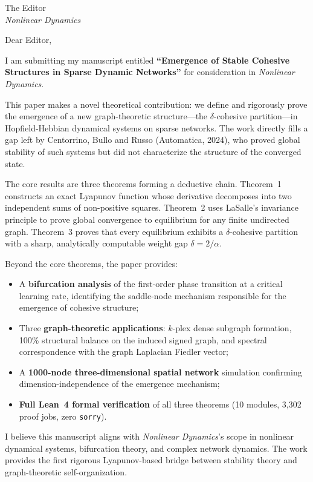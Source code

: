 \documentclass[a4paper,11pt]{letter}
\begin{document}
\begin{letter}{The Editor\\
\textit{Nonlinear Dynamics}}

\opening{Dear Editor,}

I am submitting my manuscript entitled \textbf{``Emergence of Stable Cohesive Structures in Sparse Dynamic Networks''} for consideration in \textit{Nonlinear Dynamics}.

This paper makes a novel theoretical contribution: we define and rigorously prove the emergence of a new graph-theoretic structure---the $\delta$-cohesive partition---in Hopfield-Hebbian dynamical systems on sparse networks. The work directly fills a gap left by Centorrino, Bullo and Russo (Automatica, 2024), who proved global stability of such systems but did not characterize the structure of the converged state.

The core results are three theorems forming a deductive chain. Theorem~1 constructs an exact Lyapunov function whose derivative decomposes into two independent sums of non-positive squares. Theorem~2 uses LaSalle's invariance principle to prove global convergence to equilibrium for any finite undirected graph. Theorem~3 proves that every equilibrium exhibits a $\delta$-cohesive partition with a sharp, analytically computable weight gap $\delta = 2/\alpha$.

Beyond the core theorems, the paper provides:
\begin{itemize}
    \item A \textbf{bifurcation analysis} of the first-order phase transition at a critical learning rate, identifying the saddle-node mechanism responsible for the emergence of cohesive structure;
    \item Three \textbf{graph-theoretic applications}: $k$-plex dense subgraph formation, 100\% structural balance on the induced signed graph, and spectral correspondence with the graph Laplacian Fiedler vector;
    \item A \textbf{1000-node three-dimensional spatial network} simulation confirming dimension-independence of the emergence mechanism;
    \item \textbf{Full Lean~4 formal verification} of all three theorems (10 modules, 3,302 proof jobs, zero \texttt{sorry}).
\end{itemize}

I believe this manuscript aligns with \textit{Nonlinear Dynamics}'s scope in nonlinear dynamical systems, bifurcation theory, and complex network dynamics. The work provides the first rigorous Lyapunov-based bridge between stability theory and graph-theoretic self-organization.


\end{letter}
\end{document}
